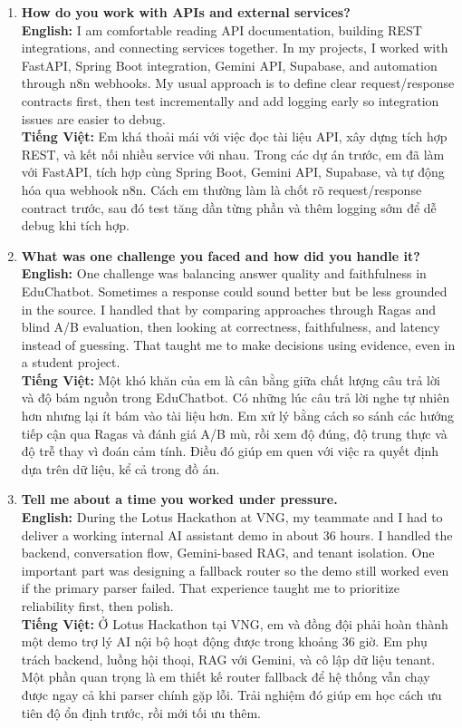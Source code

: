 \documentclass[11pt,a4paper]{article}
\begin{document}
\begin{enumerate}[leftmargin=*, itemsep=10pt]
\item \textbf{How do you work with APIs and external services?}\\
\textbf{English:} I am comfortable reading API documentation, building REST integrations, and connecting services together. In my projects, I worked with FastAPI, Spring Boot integration, Gemini API, Supabase, and automation through n8n webhooks. My usual approach is to define clear request/response contracts first, then test incrementally and add logging early so integration issues are easier to debug.\\
\textbf{Tiếng Việt:} Em khá thoải mái với việc đọc tài liệu API, xây dựng tích hợp REST, và kết nối nhiều service với nhau. Trong các dự án trước, em đã làm với FastAPI, tích hợp cùng Spring Boot, Gemini API, Supabase, và tự động hóa qua webhook n8n. Cách em thường làm là chốt rõ request/response contract trước, sau đó test tăng dần từng phần và thêm logging sớm để dễ debug khi tích hợp.

\item \textbf{What was one challenge you faced and how did you handle it?}\\
\textbf{English:} One challenge was balancing answer quality and faithfulness in EduChatbot. Sometimes a response could sound better but be less grounded in the source. I handled that by comparing approaches through Ragas and blind A/B evaluation, then looking at correctness, faithfulness, and latency instead of guessing. That taught me to make decisions using evidence, even in a student project.\\
\textbf{Tiếng Việt:} Một khó khăn của em là cân bằng giữa chất lượng câu trả lời và độ bám nguồn trong EduChatbot. Có những lúc câu trả lời nghe tự nhiên hơn nhưng lại ít bám vào tài liệu hơn. Em xử lý bằng cách so sánh các hướng tiếp cận qua Ragas và đánh giá A/B mù, rồi xem độ đúng, độ trung thực và độ trễ thay vì đoán cảm tính. Điều đó giúp em quen với việc ra quyết định dựa trên dữ liệu, kể cả trong đồ án.

\item \textbf{Tell me about a time you worked under pressure.}\\
\textbf{English:} During the Lotus Hackathon at VNG, my teammate and I had to deliver a working internal AI assistant demo in about 36 hours. I handled the backend, conversation flow, Gemini-based RAG, and tenant isolation. One important part was designing a fallback router so the demo still worked even if the primary parser failed. That experience taught me to prioritize reliability first, then polish.\\
\textbf{Tiếng Việt:} Ở Lotus Hackathon tại VNG, em và đồng đội phải hoàn thành một demo trợ lý AI nội bộ hoạt động được trong khoảng 36 giờ. Em phụ trách backend, luồng hội thoại, RAG với Gemini, và cô lập dữ liệu tenant. Một phần quan trọng là em thiết kế router fallback để hệ thống vẫn chạy được ngay cả khi parser chính gặp lỗi. Trải nghiệm đó giúp em học cách ưu tiên độ ổn định trước, rồi mới tối ưu thêm.


\end{enumerate}
\end{document}

